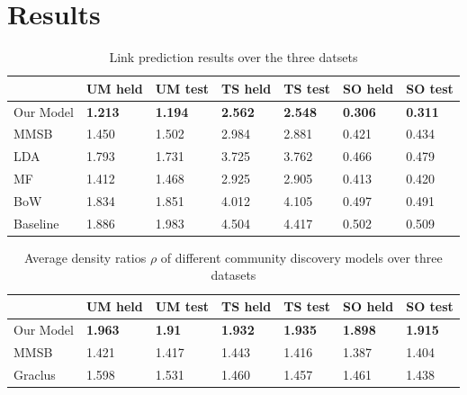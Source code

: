 \documentclass{sig-alternate}
\begin{document}
\section{Results}
\label{sec:results}

\begin{table}
\begin{center} 
\begin{tabular}{p{1cm}|p{0.7cm}|p{0.7cm}|p{0.7cm}|p{0.7cm}|p{0.7cm}|p{0.7cm}|}
  & UM held & UM test & TS held & TS test & SO held & SO test \\\hline
Our Model & \textbf{1.213} &\textbf{1.194} &\textbf{2.562} & \textbf{2.548} & 
\textbf{0.306}& \textbf{0.311} \\\hline 
MMSB &1.450& 1.502 & 2.984& 2.881 &0.421 & 0.434 \\\hline 
LDA &1.793& 1.731	&3.725 & 3.762 &0.466 & 0.479\\\hline
MF & 1.412 & 1.468 & 2.925 & 2.905 & 0.413 & 0.420 \\\hline
BoW &1.834 & 1.851 & 4.012 & 4.105 & 0.497 & 0.491 \\\hline
Baseline &1.886& 1.983 &4.504 &4.417&0.502& 0.509\\\hline
\end{tabular}
\caption{\small{Link prediction results over the three datsets}}
\label{tab:predictionResults}
\end{center}
\end{table}

\begin{table}
\begin{center} 
\begin{tabular}{p{1cm}|p{0.7cm}|p{0.7cm}|p{0.7cm}|p{0.7cm}|p{0.7cm}|p{0.7cm}|}
  & UM held & UM test & TS held & TS test & SO held & SO test \\\hline
Our Model & \textbf{1.963} &\textbf{1.91} &\textbf{1.932} & \textbf{1.935} & 
\textbf{1.898}& \textbf{1.915} \\\hline 
MMSB &1.421& 1.417 & 1.443& 1.416 &1.387 & 1.404 \\\hline 
Graclus &1.598& 1.531	&1.460 & 1.457 &1.461 & 1.438\\\hline
\end{tabular}
\caption{\small{Average density ratios $\rho$ of different community 
discovery models over three datasets}}
\label{tab:rhoResults}
\end{center}
\end{table}
\end{document}
